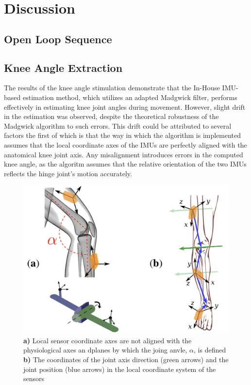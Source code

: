 

\section{Discussion}
\subsection{Open Loop Sequence}

\subsection{Knee Angle Extraction}

The results of the knee angle stimulation demonstrate that the In-House IMU-based estimation method, which utilizes an adapted Madgwick filter, performs effectively in estimating knee joint angles during movement. However, slight drift in the estimation was observed, despite the theoretical robustness of the Madgwick algorithm to such errors. This drift could be attributed to several factors the first of which is that the way in which the algorithm is implemented assumes that the local coordinate axes of the IMUs are perfectly aligned with the anatomical knee joint axis. Any misalignment introduces errors in the computed knee angle, as the algoritm assumes that the relative orientation of the two IMUs reflects the hinge joint's motion accurately.

\begin{figure}
    \centering
    \includegraphics[width=0.75\linewidth]{images/kneeOrientation.png}
    \caption{\textbf{a)} Local sensor coordinate axes are not aligned with the physiological axes an dplanes by which the joing anvle, \(\alpha\), is defined \textbf{b)} The coordinates of the joint axis direction (green arrows) and the joint position (blue arrows) in the local coordinate system of the sensors \cite{seel_imu-based_2014}}
    \label{fig:enter-label}
\end{figure}

